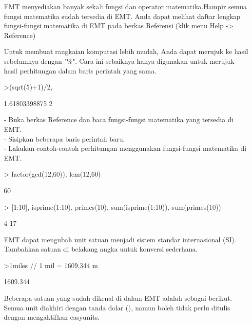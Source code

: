 \documentclass[a4paper,10pt]{article}
\begin{document}
\begin{eulernotebook}
\begin{eulercomment}
EMT menyediakan banyak sekali fungsi dan operator matematika.Hampir
semua fungsi matematika sudah tersedia di EMT. Anda dapat melihat
daftar lengkap fungsi-fungsi matematika di EMT pada berkas Referensi
(klik menu Help -\textgreater{} Reference)

Untuk membuat rangkaian komputasi lebih mudah, Anda dapat merujuk ke
hasil sebelumnya dengan "\%". Cara ini sebaiknya hanya digunakan untuk
merujuk hasil perhitungan dalam baris perintah yang sama.
\end{eulercomment}
\begin{eulerprompt}
>(sqrt(5)+1)/2, %
\end{eulerprompt}
\begin{euleroutput}
  1.61803398875
  2
\end{euleroutput}
\begin{eulercomment}
- Buka berkas Reference dan baca fungsi-fungsi matematika yang
tersedia di EMT.\\
- Sisipkan beberapa baris perintah baru.\\
- Lakukan contoh-contoh perhitungan menggunakan fungsi-fungsi
matematika di EMT.

\end{eulercomment}
\begin{eulerprompt}
> factor(gcd(12,60)), lcm(12,60)
\end{eulerprompt}
\begin{euleroutput}
  [2,  2,  3]
  60
\end{euleroutput}
\begin{eulerprompt}
> [1:10], isprime(1:10), primes(10), sum(isprime(1:10)), sum(primes(10))
\end{eulerprompt}
\begin{euleroutput}
  [1,  2,  3,  4,  5,  6,  7,  8,  9,  10]
  [0,  1,  1,  0,  1,  0,  1,  0,  0,  0]
  [2,  3,  5,  7]
  4
  17
\end{euleroutput}
\begin{eulercomment}
\end{eulercomment}
\eulersubheading{}
\begin{eulercomment}

\end{eulercomment}
\begin{eulercomment}
EMT dapat mengubah unit satuan menjadi sistem standar internasional
(SI). Tambahkan satuan di belakang angka untuk konversi sederhana.
\end{eulercomment}
\begin{eulerprompt}
>1miles  // 1 mil = 1609,344 m
\end{eulerprompt}
\begin{euleroutput}
  1609.344
\end{euleroutput}
\begin{eulercomment}
Beberapa satuan yang sudah dikenal di dalam EMT adalah sebagai
berikut. Semua unit diakhiri dengan tanda dolar (\textdollar{}), namun boleh tidak
perlu ditulis dengan mengaktifkan easyunits.


\end{eulercomment}
\end{eulernotebook}
\end{document}

